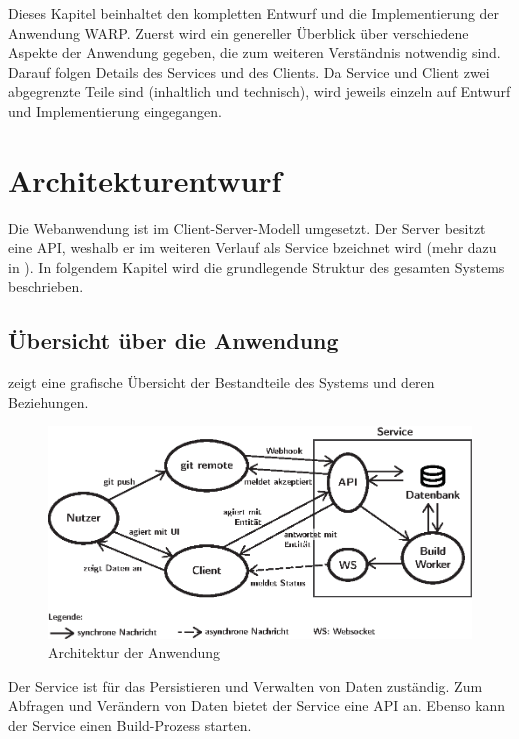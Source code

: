Dieses Kapitel beinhaltet den kompletten Entwurf und die Implementierung der Anwendung WARP. Zuerst wird ein genereller Überblick über verschiedene Aspekte der Anwendung gegeben, die zum weiteren Verständnis notwendig sind. Darauf folgen Details des Services und des Clients. Da Service und Client zwei abgegrenzte Teile sind (inhaltlich und technisch), wird jeweils einzeln auf Entwurf und Implementierung eingegangen.

\section{Architekturentwurf}
\label{sec:architektur}

Die Webanwendung ist im Client-Server-Modell umgesetzt. Der Server besitzt eine API, weshalb er im weiteren Verlauf als Service bzeichnet wird (mehr dazu in ). In folgendem Kapitel wird die grundlegende Struktur des gesamten Systems beschrieben.

\subsection{Übersicht über die Anwendung}
\label{subsec:uebersicht-anwendung}

 zeigt eine grafische Übersicht der Bestandteile des Systems und deren Beziehungen.

\begin{figure}[h]
  \caption{Architektur der Anwendung}
  \label{fig:architektur}
  \centering
    \includegraphics[width=\textwidth]{assets/systemarchitektur}
\end{figure}


Der Service ist für das Persistieren und Verwalten von Daten zuständig. Zum Abfragen und Verändern von Daten bietet der Service eine \ac{API} an. Ebenso kann der Service einen Build-Prozess starten.

